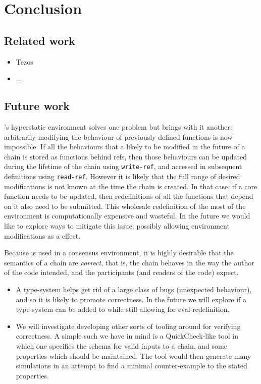 \section{Conclusion}

\subsection{Related work}

\begin{itemize}
  \item Tezos
  \item ...
\end{itemize}

\subsection{Future work}

\rad's hyperstatic environment solves one problem but brings with it another:
arbitrarily modifying the behaviour of previously defined functions is now
impossible. If all the behaviours that a likely to be modified in the future of
a chain is stored as functions behind refs, then those behaviours can be updated
during the lifetime of the chain using \texttt{write-ref}, and accessed in
subsequent definitions using \texttt{read-ref}. However it is likely that the
full range of desired modifications is not known at the time the chain is
created. In that case, if a core function needs to be updated, then
redefinitions of all the functions that depend on it also need to be submitted.
This wholesale redefinition of the most of the environment is computationally
expensive and wasteful. In the future we would like to explore ways to mitigate
this issue; possibly allowing environment modifications as a effect.

Because \rad{} is used in a consensus environment, it is highly desirable that
the semantics of a chain are \emph{correct}, that is, the chain behaves in the
way the author of the code intended, and the participants (and readers of the
code) expect.
\begin{itemize}
\item A type-system helps get rid of a large class of bugs (unexpected
  behaviour), and so it is likely to promote correctness. In the future we will
  explore if a type-system can be added to \rad{} while still allowing for
  eval-redefinition.
\item We will investigate developing other sorts of tooling around \rad{} for
  verifying correctness. A simple such we have in mind is a QuickCheck-like tool
  in which one specifies the schema for valid inputs to a chain, and some
  properties which should be maintained. The tool would then generate many
  simulations in an attempt to find a minimal counter-example to the stated
  properties.
\end{itemize}